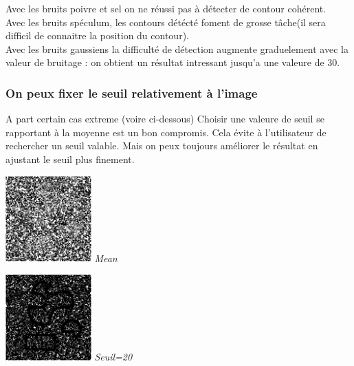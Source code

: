 \documentclass[a4,12pt]{article}
\begin{document}
Avec les bruits poivre et sel on ne réussi pas à détecter de contour cohérent.\\
Avec les bruits spéculum, les contours détécté foment de grosse tâche(il sera difficil de connaitre la position du contour).\\
Avec les bruits gaussiens la difficulté de détection augmente graduelement avec la valeur de bruitage : on obtient un résultat intressant jusqu'a une valeure de 30.\\

\subsubsection{On peux fixer le seuil relativement à l'image}
A part certain cas extreme (voire ci-dessous) Choisir une valeure de seuil se rapportant à la moyenne
est un bon compromis. Cela évite à l'utilisateur de rechercher un seuil valable.
Mais on peux toujours améliorer le résultat en ajustant le seuil plus finement.\\
\noindent
\begin{center}
\begin{minipage}[c]{0.20\linewidth}
	\begin{center}
		\includegraphics[width = 33mm]{./img/p2test_grad_mean_formes1pets5.jpg}
		\textit{Mean}
	\end{center}
\end{minipage}
\begin{minipage}[c]{0.20\linewidth}
	\begin{center}
		\includegraphics[width = 33mm]{./img/p2test_grad_const_formes1pets5.jpg}
		\textit{Seuil=20}
	\end{center}
\end{minipage}
\end{center}
\end{document}
